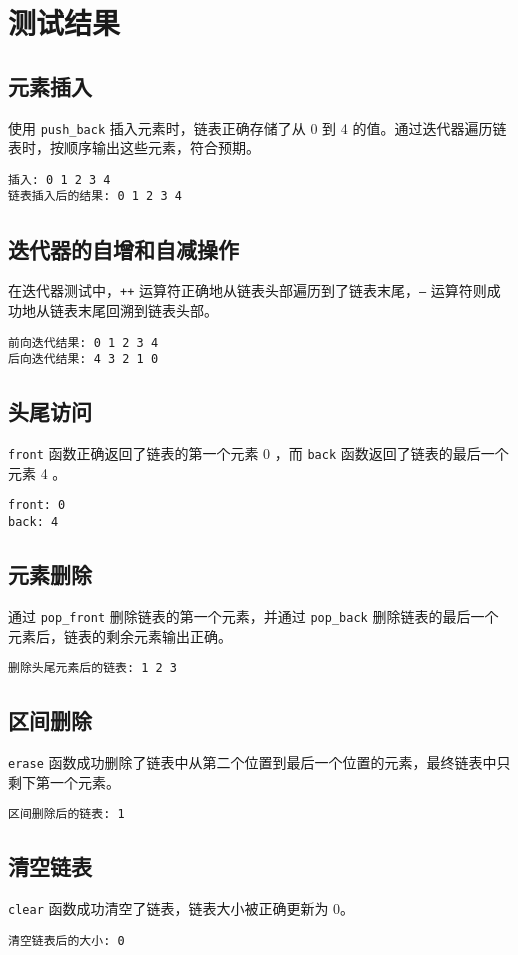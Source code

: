 \documentclass[UTF8]{ctexart}
\begin{document}
\section{测试结果}
\subsection{元素插入}
使用 \texttt{push\_back} 插入元素时，链表正确存储了从 0 到 4 的值。通过迭代器遍历链表时，按顺序输出这些元素，符合预期。

\begin{verbatim}
插入: 0 1 2 3 4
链表插入后的结果: 0 1 2 3 4
\end{verbatim}

\subsection{迭代器的自增和自减操作}
在迭代器测试中，\texttt{++} 运算符正确地从链表头部遍历到了链表末尾，\texttt{--} 运算符则成功地从链表末尾回溯到链表头部。

\begin{verbatim}
前向迭代结果: 0 1 2 3 4
后向迭代结果: 4 3 2 1 0
\end{verbatim}

\subsection{头尾访问}
\texttt{front} 函数正确返回了链表的第一个元素 0 ，而 \texttt{back} 函数返回了链表的最后一个元素 4 。

\begin{verbatim}
front: 0
back: 4
\end{verbatim}

\subsection{元素删除}
通过 \texttt{pop\_front} 删除链表的第一个元素，并通过 \texttt{pop\_back} 删除链表的最后一个元素后，链表的剩余元素输出正确。

\begin{verbatim}
删除头尾元素后的链表: 1 2 3
\end{verbatim}

\subsection{区间删除}
\texttt{erase} 函数成功删除了链表中从第二个位置到最后一个位置的元素，最终链表中只剩下第一个元素。

\begin{verbatim}
区间删除后的链表: 1
\end{verbatim}

\subsection{清空链表}
\texttt{clear} 函数成功清空了链表，链表大小被正确更新为 0。

\begin{verbatim}
清空链表后的大小: 0
\end{verbatim}
\end{document}
